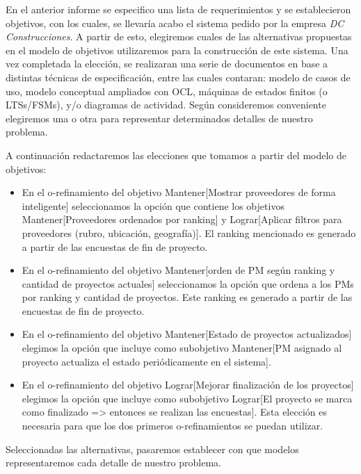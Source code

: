 En el anterior informe se especifico una lista de requerimientos y se establecieron objetivos, con los cuales,
se llevaría acabo el sistema pedido por la empresa \textit{DC Construcciones}. A partir de esto,
elegiremos cuales de las alternativas propuestas en el modelo de objetivos utilizaremos para la
construcción de este sistema. Una vez completada la elección, se realizaran una serie de documentos
en base a distintas técnicas de especificación, entre las cuales contaran: modelo de casos de uso,
modelo conceptual ampliados con OCL, máquinas de estados finitos (o LTSs/FSMs), y/o diagramas
de actividad. Según consideremos conveniente elegiremos una o otra para representar determinados
detalles de nuestro problema.

A continuación redactaremos las elecciones que tomamos a partir del modelo de objetivos:

\begin{itemize}
\item En el o-refinamiento del objetivo Mantener[Mostrar proveedores de forma inteligente] seleccionamos la opción que contiene los objetivos Mantener[Proveedores ordenados por ranking] y Lograr[Aplicar filtros para proveedores (rubro, ubicación, geografía)]. El ranking mencionado es generado a partir de las encuestas de fin de proyecto.
\item En el o-refinamiento del objetivo Mantener[orden de PM según ranking y cantidad de proyectos actuales] seleccionamos la opción que ordena a los PMs por ranking y cantidad de proyectos. Este ranking es generado a partir de las encuestas de fin de proyecto.
\item En el o-refinamiento del objetivo Mantener[Estado de proyectos actualizados] elegimos la opción que incluye como subobjetivo Mantener[PM asignado al proyecto
actualiza el estado periódicamente en el sistema].
\item En el o-refinamiento del objetivo Lograr[Mejorar finalización de los proyectos] elegimos la opción que incluye como subobjetivo Lograr[El proyecto se marca como finalizado => entonces se realizan las encuestas]. Esta elección es necesaria para que los dos primeros o-refinamientos se puedan utilizar.
\end{itemize}

Seleccionadas las alternativas, pasaremos establecer con que modelos representaremos cada detalle de nuestro problema.


